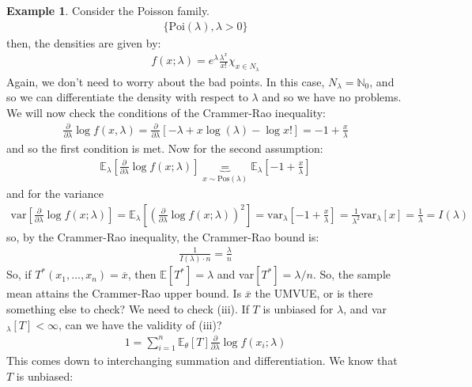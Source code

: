 \documentclass[11pt]{scrartcl}
\theoremstyle{definition}
\newtheorem{ex}{Example}
\theoremstyle{remark}
\newcommand{\EX}[1]{\mathbb{E}\left[#1 \right]}
\newcommand{\EXth}[1]{\mathbb{E}_\theta \left[ #1 \right]}
\begin{document}
{\begin{ex}
	Consider the Poisson family. 
	\begin{align*}
		\{ \text{Poi}(\lambda), \lambda > 0 \} 
	\end{align*}
	then, the densities are given by: 
	\begin{align*}
		f(x; \lambda) = e^\lambda \frac{\lambda^x}{x!} \chi_{x \in N_\lambda} 	
	\end{align*}
	Again, we don't need to worry about the bad points. In this case, $N_\lambda = \mathbb{N}_0$, and so we can differentiate the density with respect to $\lambda$ and so we have no problems. We will now check the conditions of the Crammer-Rao inequality: 
	\begin{align*}
		\frac{\partial}{\partial \lambda} \log f(x, \lambda) = \frac{\partial}{\partial \lambda} \left[ 	-\lambda + x \log (\lambda) - \log x!		\right] 	 = -1 + \frac{x}{\lambda}
	\end{align*}
	and so the first condition is met. Now for the second assumption: 
	\begin{align*}
		\mathbb{E}_\lambda \left[ 	\frac{\partial}{\partial \lambda} \log f(x; \lambda) 	\right] \underbrace{=}_{x \sim \text{Pos}(\lambda)} \mathbb{E}_\lambda \left[ 	-1 + \frac{x}{\lambda}		\right]
	\end{align*}
	and for the variance
	\begin{align*}
		\text{var} \left[ \frac{\partial}{\partial \lambda } \log f(x; \lambda) \right] 	 = \mathbb{E}_\lambda \left[ 	\left( 	\frac{\partial}{\partial \lambda}	 \log f(x; \lambda) \right)^2		\right] = \text{var}_\lambda \left[ -1 + \frac{x}{\lambda} \right] = \frac{1}{\lambda^2} \text{var}_\lambda[x] = \frac{1}{\lambda} = I(\lambda) 
	\end{align*}
	so, by the Crammer-Rao inequality, the Crammer-Rao bound is: 
	\begin{align*}
		\frac{1}{I(\lambda) \cdot n} = \frac{\lambda}{n}	
	\end{align*}
	So, if $T^*(x_1, ..., x_n)  = \overline{x}$, then $\EX{T^*} = \lambda$ and var$[T^*] = \lambda / n$. So, the sample mean attains the Crammer-Rao upper bound. Is $\overline{x}$ the UMVUE, or is there something else to check? We need to check (iii). If $T$ is unbiased for $\lambda$, and var$_\lambda [T]< \infty$, can we have the validity of (iii)? 
	\begin{align*}
		1 = \sum_{i=1}^n \EXth{T} \frac{\partial}{\partial \lambda} \log f(x_i; \lambda) 	
	\end{align*}
	This comes down to interchanging summation and differentiation. We know that $T$ is unbiased: 

\end{ex}}
\end{document}
